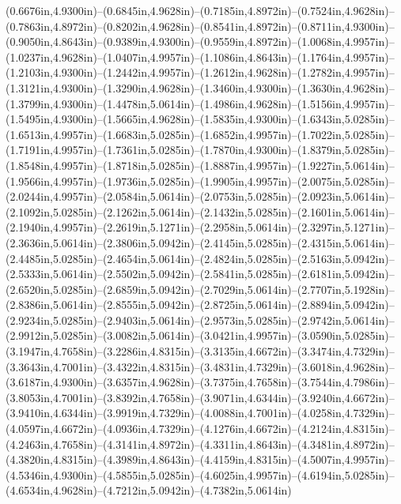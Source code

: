 (0.6676in,4.9300in)--(0.6845in,4.9628in)--(0.7185in,4.8972in)--(0.7524in,4.9628in)--(0.7863in,4.8972in)--(0.8202in,4.9628in)--(0.8541in,4.8972in)--(0.8711in,4.9300in)--(0.9050in,4.8643in)--(0.9389in,4.9300in)--(0.9559in,4.8972in)--(1.0068in,4.9957in)--(1.0237in,4.9628in)--(1.0407in,4.9957in)--(1.1086in,4.8643in)--(1.1764in,4.9957in)--(1.2103in,4.9300in)--(1.2442in,4.9957in)--(1.2612in,4.9628in)--(1.2782in,4.9957in)--(1.3121in,4.9300in)--(1.3290in,4.9628in)--(1.3460in,4.9300in)--(1.3630in,4.9628in)--(1.3799in,4.9300in)--(1.4478in,5.0614in)--(1.4986in,4.9628in)--(1.5156in,4.9957in)--(1.5495in,4.9300in)--(1.5665in,4.9628in)--(1.5835in,4.9300in)--(1.6343in,5.0285in)--(1.6513in,4.9957in)--(1.6683in,5.0285in)--(1.6852in,4.9957in)--(1.7022in,5.0285in)--(1.7191in,4.9957in)--(1.7361in,5.0285in)--(1.7870in,4.9300in)--(1.8379in,5.0285in)--(1.8548in,4.9957in)--(1.8718in,5.0285in)--(1.8887in,4.9957in)--(1.9227in,5.0614in)--(1.9566in,4.9957in)--(1.9736in,5.0285in)--(1.9905in,4.9957in)--(2.0075in,5.0285in)--(2.0244in,4.9957in)--(2.0584in,5.0614in)--(2.0753in,5.0285in)--(2.0923in,5.0614in)--(2.1092in,5.0285in)--(2.1262in,5.0614in)--(2.1432in,5.0285in)--(2.1601in,5.0614in)--(2.1940in,4.9957in)--(2.2619in,5.1271in)--(2.2958in,5.0614in)--(2.3297in,5.1271in)--(2.3636in,5.0614in)--(2.3806in,5.0942in)--(2.4145in,5.0285in)--(2.4315in,5.0614in)--(2.4485in,5.0285in)--(2.4654in,5.0614in)--(2.4824in,5.0285in)--(2.5163in,5.0942in)--(2.5333in,5.0614in)--(2.5502in,5.0942in)--(2.5841in,5.0285in)--(2.6181in,5.0942in)--(2.6520in,5.0285in)--(2.6859in,5.0942in)--(2.7029in,5.0614in)--(2.7707in,5.1928in)--(2.8386in,5.0614in)--(2.8555in,5.0942in)--(2.8725in,5.0614in)--(2.8894in,5.0942in)--(2.9234in,5.0285in)--(2.9403in,5.0614in)--(2.9573in,5.0285in)--(2.9742in,5.0614in)--(2.9912in,5.0285in)--(3.0082in,5.0614in)--(3.0421in,4.9957in)--(3.0590in,5.0285in)--(3.1947in,4.7658in)--(3.2286in,4.8315in)--(3.3135in,4.6672in)--(3.3474in,4.7329in)--(3.3643in,4.7001in)--(3.4322in,4.8315in)--(3.4831in,4.7329in)--(3.6018in,4.9628in)--(3.6187in,4.9300in)--(3.6357in,4.9628in)--(3.7375in,4.7658in)--(3.7544in,4.7986in)--(3.8053in,4.7001in)--(3.8392in,4.7658in)--(3.9071in,4.6344in)--(3.9240in,4.6672in)--(3.9410in,4.6344in)--(3.9919in,4.7329in)--(4.0088in,4.7001in)--(4.0258in,4.7329in)--(4.0597in,4.6672in)--(4.0936in,4.7329in)--(4.1276in,4.6672in)--(4.2124in,4.8315in)--(4.2463in,4.7658in)--(4.3141in,4.8972in)--(4.3311in,4.8643in)--(4.3481in,4.8972in)--(4.3820in,4.8315in)--(4.3989in,4.8643in)--(4.4159in,4.8315in)--(4.5007in,4.9957in)--(4.5346in,4.9300in)--(4.5855in,5.0285in)--(4.6025in,4.9957in)--(4.6194in,5.0285in)--(4.6534in,4.9628in)--(4.7212in,5.0942in)--(4.7382in,5.0614in)
